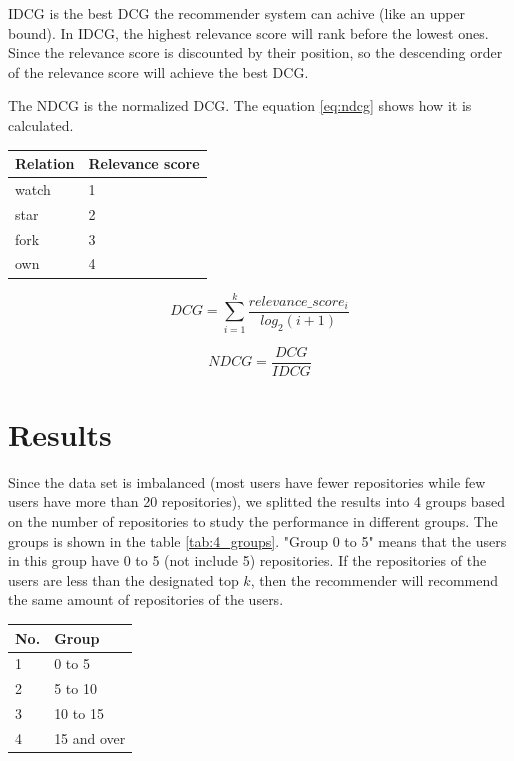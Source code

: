 \documentclass[11pt,twoside]{report}
\begin{document}
IDCG is the best DCG the recommender system can achive (like an upper bound). In IDCG, the highest relevance score will rank before the lowest ones. Since the relevance score is discounted by their position, so the descending order of the relevance score will achieve the best DCG.

The NDCG is the normalized DCG. The equation \ref{eq:ndcg} shows how it is calculated.

\begin{center}
    \begin{tabular}{l | l}
    \hline
    Relation & Relevance score \\
    \hline
    watch & 1 \\
    star & 2 \\
    fork & 3 \\
    own & 4
    \end{tabular}
    \label{tab:relevance_score}
\end{center}

\begin{equation}
    DCG=\sum_{i=1}^k\frac{relevance\_score_i}{log_2(i+1)}
    \label{eq:dcg}
\end{equation}

\begin{equation}
    NDCG=\frac{DCG}{IDCG}
    \label{eq:ndcg}
\end{equation}

\section{Results}
Since the data set is imbalanced (most users have fewer repositories while few users have more than 20 repositories), we splitted the results into 4 groups based on the number of repositories to study the performance in different groups. The groups is shown in the table \ref{tab:4_groups}. "Group 0 to 5" means that the users in this group have 0 to 5 (not include 5) repositories. If the repositories of the users are less than the designated top $k$, then the recommender will recommend the same amount of repositories of the users.

\begin{center}
    \begin{tabular}{l | l}
    \hline
    No. & Group \\
    \hline
    1 & 0 to 5 \\
    2 & 5 to 10 \\
    3 & 10 to 15 \\
    4 & 15 and over
    \end{tabular}
    \label{tab:4_groups}
\end{center}
\end{document}
